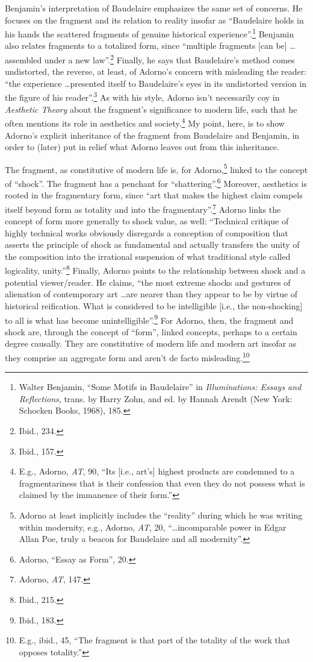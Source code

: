 \documentclass[12pt]{article}
\begin{document}
Benjamin's interpretation of Baudelaire emphasizes the same set of concerns. He focuses on the fragment and its relation to reality insofar as ``Baudelaire holds in his hands the scattered fragments of genuine historical experience''.\footnote{Walter Benjamin, ``Some Motifs in Baudelaire'' in \textit{Illuminations: Essays and Reflections}, trans. by Harry Zohn, and ed. by  Hannah Arendt (New York: Schocken Books, 1968), 185.} Benjamin also relates fragments to a totalized form, since ``multiple fragments [can be] \dots  assembled under a new law''.\footnote{Ibid., 234.} Finally, he says that Baudelaire's method comes undistorted, the reverse, at least, of Adorno's concern with misleading the reader: ``the experience \dots  presented itself to Baudelaire's eyes in its undistorted version in the figure of his reader''.\footnote{Ibid., 157.} As with his style, Adorno isn't necessarily coy in \textit{Aesthetic Theory} about the fragment's significance to modern life, such that he often mentions its role in aesthetics and society.\footnote{E.g., Adorno, \textit{AT}, 90, ``Its [i.e., art's] highest products are condemned to a fragmentariness that is their confession that even they do not possess what is claimed by the immanence of their form.''} My point, here, is to show Adorno's explicit inheritance of the fragment from Baudelaire and Benjamin, in order to (later) put in relief what Adorno leaves out from this inheritance.  

The fragment, as constitutive of modern life is, for Adorno,\footnote{Adorno at least implicitly includes the ``reality'' during which he was writing within modernity, e.g., Adorno, \textit{AT}, 20, ``\dots  incomparable power in Edgar Allan Poe, truly a beacon for Baudelaire and all modernity''.} linked to the concept of ``shock''. The fragment has a penchant for ``shattering''.\footnote{Adorno, ``Essay as Form'', 20.} Moreover, aesthetics is rooted in the fragmentary form, since ``art that makes the highest claim compels itself beyond form as totality and into the fragmentary''.\footnote{Adorno, \textit{AT}, 147.} Adorno links the concept of form more generally to shock value, as well: ``Technical critique of highly technical works obviously disregards a conception of composition that asserts the principle of shock as fundamental and actually transfers the unity of the composition into the irrational suspension of what traditional style called logicality, unity.''\footnote{Ibid., 215.} Finally, Adorno points to the relationship between shock and a potential viewer/reader. He claims, ``the most extreme shocks and gestures of alienation of contemporary art \dots  are nearer than they appear to be by virtue of historical reification. What is considered to be intelligible [i.e., the non-shocking] to all is what has become unintelligible''.\footnote{Ibid., 183.} For Adorno, then, the fragment and shock are, through the concept of ``form'', linked concepts, perhaps to a certain degree causally. They are constitutive of modern life and modern art insofar as they comprise an aggregate form and aren't de facto misleading.\footnote{E.g., ibid., 45, ``The fragment is that part of the totality of the work that opposes totality.''}  
\end{document}
